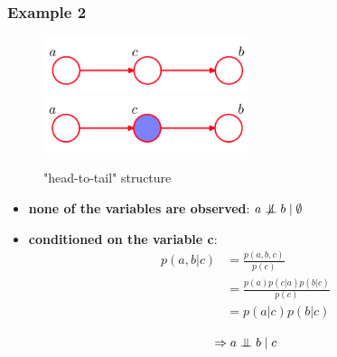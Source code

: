 \documentclass[a3paper, 12pt]{book} %
\newcommand{\CI}{\mathrel{\perp\mspace{-10mu}\perp}}
\newcommand{\nCI}{\centernot{\CI}}
\begin{document}
\subsubsection{Example 2}
\begin{figure}[htpb]
	\centering
	\includegraphics[width=6cm]{figures/bn_ex2_1.png}
	\includegraphics[width=6cm]{figures/bn_ex2_2.png}
	\caption{"head-to-tail" structure}
	\label{fig:ci_example2}
\end{figure}
\begin{itemize}
	\item \textbf{none of the variables are observed}: 
	$a \nCI b \mid \emptyset$
	\item \textbf{conditioned on the variable c}: 
	\begin{equation}
		\begin{split}
		p(a,b|c) & = \frac{p(a,b,c)}{p(c)} \\
		& = \frac{p(a)p(c|a)p(b|c)}{p(c)} \\
		& =p(a|c)p(b|c)\\
		\end{split}
	\end{equation}
	$$\Rightarrow a \CI b \mid c$$
\end{itemize}
\end{document}
